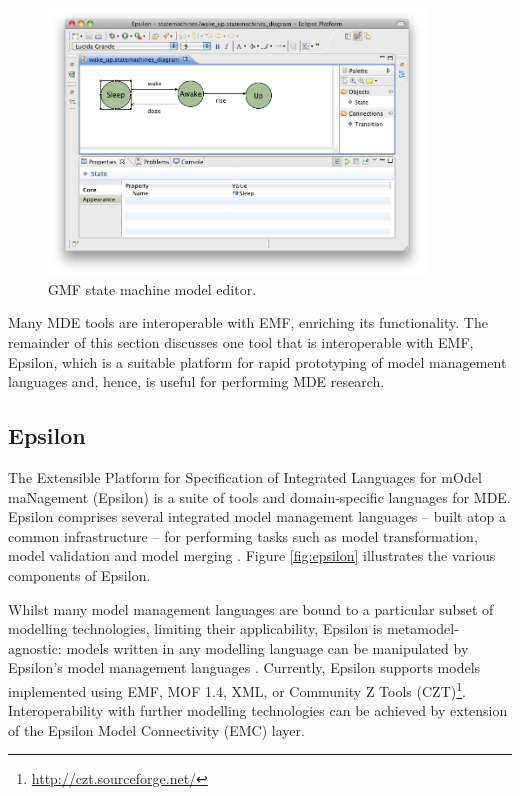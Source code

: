 \begin{figure}[htbp]
  \begin{center}
    \leavevmode
    \includegraphics[width=10cm]{2.Background/images/gmf_model_editor.png}
  \end{center}
  \caption{GMF state machine model editor.}
  \label{fig:gmf_model_editor}
\end{figure}

Many MDE tools are interoperable with EMF, enriching its functionality. The remainder of this section discusses one tool that is interoperable with EMF, Epsilon, which is a suitable platform for rapid prototyping of model management languages and, hence, is useful for performing MDE research.

\subsection{Epsilon}
\label{subsec:epsilon}
The Extensible Platform for Specification of Integrated Languages for mOdel maNagement (Epsilon) \cite{kolovos09thesis} is a suite of tools and domain-specific languages for MDE. Epsilon comprises several integrated model management languages -- built atop a common infrastructure -- for performing tasks such as model transformation, model validation and model merging \cite{kolovos09thesis}. Figure \ref{fig:epsilon} illustrates the various components of Epsilon.

Whilst many model management languages are bound to a particular subset of modelling technologies, limiting their applicability, Epsilon is metamodel-agnostic: models written in any modelling language can be manipulated by Epsilon's model management languages \cite{kolovos06eol}. Currently, Epsilon supports models implemented using EMF, MOF 1.4, XML, or Community Z Tools (CZT)\footnote{\url{http://czt.sourceforge.net/}}. Interoperability with further modelling technologies can be achieved by extension of the Epsilon Model Connectivity (EMC) layer. 

